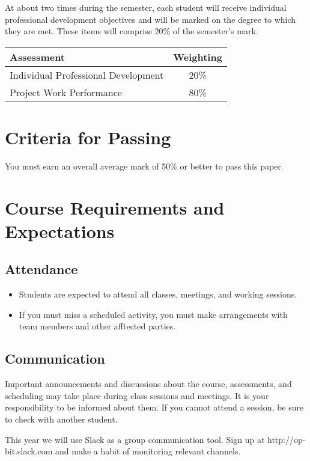 \documentclass{article}
\begin{document}
At about two times during the semester, each student will receive individual professional development objectives and will be marked on the degree to which they are met. These items will comprise 20\% of the semester's mark.

\medskip


\begin{tabular}{|l|c|}
\hline
Assessment                          & Weighting \\ \hline
Individual Professional Development &  20\% \\ \hline
Project Work Performance            &  80\% \\ \hline
\end{tabular}


\section*{Criteria for Passing}
You must earn an overall average mark of 50\% or better to pass this paper.

\newpage

\section*{Course Requirements and Expectations}
\subsection*{Attendance}
\begin{itemize}
 \item Students are expected to attend all classes, meetings, and working sessions.
 \item If you must miss a scheduled activity, you must make arrangements with team members and other afftected parties.
\end{itemize}

\subsection*{Communication}
Important announcements and discussions about the course, assessments, and scheduling may take place during class sessions and meetings.  It is your responsibility to be informed about them.  If you cannot attend a session, be sure to check with another student.

This year we will use Slack as a group communication tool. Sign up at http://op-bit.slack.com and make a habit of monitoring relevant channels.
\end{document}
